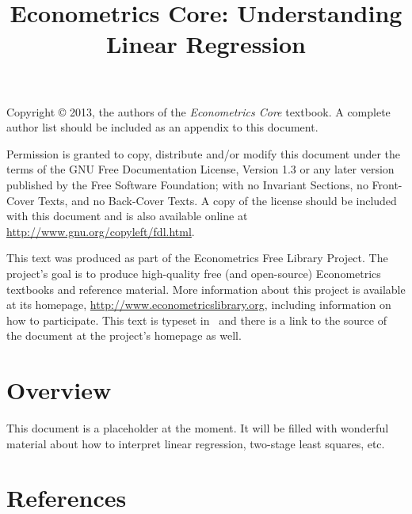 \documentclass{tex/tufte-handout}
\title{Econometrics Core: Understanding Linear Regression}
\begin{document}
\maketitle

\bigskip\noindent%
Copyright © 2013, the authors of the \textit{Econometrics Core}
textbook.  A complete author list should be included as an appendix to
this document.

Permission is granted to copy, distribute and/or modify this document
under the terms of the GNU Free Documentation License, Version 1.3 or
any later version published by the Free Software Foundation; with no
Invariant Sections, no Front-Cover Texts, and no Back-Cover Texts.  A
copy of the license should be included with this document and is also
available online at \url{http://www.gnu.org/copyleft/fdl.html}.

This text was produced as part of the Econometrics Free Library
Project.  The project's goal is to produce high-quality free (and
open-source) Econometrics textbooks and reference material.  More
information about this project is available at its homepage,
\url{http://www.econometricslibrary.org}, including information on how
to participate.  This text is typeset in \XeLaTeX\ and there is a link
to the source of the document at the project's homepage as well.

%
\tableofcontents

\part*{Overview}%

This document is a placeholder at the moment.  It will be filled with
wonderful material about how to interpret linear regression, two-stage
least squares, etc.






% 

\part*{References}%

\end{document}
